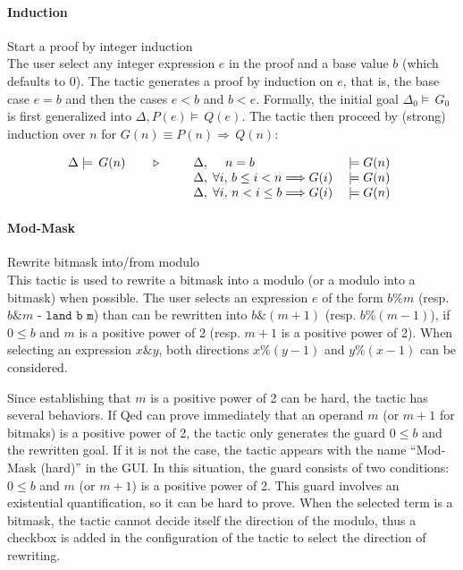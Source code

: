 \paragraph{Induction} Start a proof by integer induction \\
The user select any integer expression $e$ in the proof and a base value $b$ (which defaults to
0). The tactic generates a proof by induction on $e$, that is, the base case
$e = b$ and then the cases $e < b$ and $b < e$. Formally, the initial goal
$\Delta_0\models\,G_0$ is first generalized into $\Delta,P(e)\models\,Q(e)$. The tactic
then proceed by (strong) induction over $n$ for
$G(n) \equiv P(n)\Longrightarrow\,Q(n)$:

\[\TACTIC{\Delta\models\,G(n)}{%
\begin{array}[t]{lll}
\Delta,\; \quad n = b & \models G(n) \\
\Delta,\; \forall i,\, b \leq i < n \Longrightarrow G(i) \; & \models G(n) \\
\Delta,\; \forall i,\, n < i \leq b \Longrightarrow G(i) \; & \models G(n)
\end{array}} \]

\paragraph{Mod-Mask} Rewrite bitmask into/from modulo \\
This tactic is used to rewrite a bitmask into a modulo (or a modulo into a
bitmask) when possible. The user selects an expression $e$ of the form
$b \% m$ (resp. $b \& m$ - $\texttt{land b m}$) than can be rewritten into
$b \& (m+1)$ (resp. $b \% (m - 1)$), if $0 \leq b$ and $m$ is a positive power
of 2 (resp. $m + 1$ is a positive power of 2). When selecting an expression
$x \& y$, both directions $x \% (y - 1)$ and $y \% (x - 1)$ can be considered.

Since establishing that $m$ is a positive power of 2 can be hard, the tactic has
several behaviors. If \textsf{Qed} can prove immediately that an operand $m$ (or
$m+1$ for bitmaks) is a positive power of 2, the tactic only generates the guard
$0 \leq b$ and the rewritten goal. If it is not the case, the tactic appears
with the name ``Mod-Mask (hard)'' in the GUI. In this situation, the guard
consists of two conditions: $0 \leq b$ and $m$ (or $m+1$) is a positive power of
2. This guard involves an existential quantification, so it can be hard to
prove. When the selected term is a bitmask, the tactic cannot decide itself the
direction of the modulo, thus a checkbox is added in the configuration of the
tactic to select the direction of rewriting.


